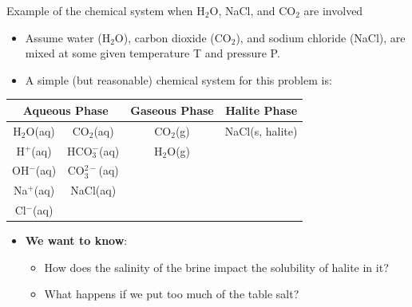 \begin{frame}{Example of the chemical system when H$_{2}$O, NaCl, and CO$_{2}$
are involved}
\begin{itemize}
\item Assume water (H$_{2}$O), carbon dioxide (CO$_{2}$), and sodium chloride
(NaCl), are mixed at some given temperature T and pressure P.
\pause 
\item A simple (but reasonable) chemical system for this problem is:
\end{itemize}
\begin{center}
\begin{tabular}{cccc}
\toprule 
\multicolumn{2}{c}{\textbf{Aqueous Phase}} & \multicolumn{1}{c}{\textbf{Gaseous Phase}} & \textbf{Halite Phase}\tabularnewline
\midrule
H$_{2}$O(aq) & CO$_{2}$(aq) & CO$_{2}$(g) & NaCl(s, halite)\tabularnewline
H$^{+}$(aq) & HCO$_{3}^{-}$(aq) & H$_{2}$O(g) & \tabularnewline
OH$^{-}$(aq) & CO$_{3}^{2-}$(aq) &  & \tabularnewline
Na$^{+}$(aq) &  NaCl(aq) &  & \tabularnewline
Cl$^{-}$(aq) &  &  & \tabularnewline
\bottomrule
\end{tabular}
\par\end{center}
\pause
\begin{itemize}
\item \alert{\textbf{We want to know}}: 
\begin{itemize}
\item How does the salinity of the brine impact the solubility of halite in it? 
\item What happens if we put too much of the table salt? 
\end{itemize}
\end{itemize}


\end{frame}
%
%
